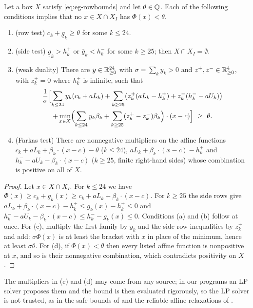 \begin{lemma}\label{lem:eg-boxtests}
Let a box $X$ satisfy \eqref{eq:eg-rowbounds} and let $\theta\in\mathbb{Q}$.
Each of the following conditions implies that no $x\in X\cap X_I$ has $\Phi(x)<\theta$.
\begin{enumerate}
\item[(a)] (row test) $c_k+\underline g_k\ge\theta$ for some $k\le24$.
\item[(b)] (side test) $\underline g_k>h^+_k$ or $\overline g_k<h^-_k$ for some $k\ge25$; then $X\cap X_I=\emptyset$.
\item[(c)] (weak duality) There are $y\in\mathbb{R}^{24}_{\ge0}$ with $\sigma=\sum_ky_k>0$ and $z^+,z^-\in\mathbb{R}^{4}_{\ge0}$, with $z^\pm_k=0$ where $h^\pm_k$ is infinite, such that
\begin{multline*}
  \frac1\sigma\Bigl[\sum_{k\le24}y_k(c_k+aL_k)+\sum_{k\ge25}\bigl(z^+_k(aL_k-h^+_k)+z^-_k(h^-_k-aU_k)\bigr)\\
  +\min_{x\in X}\Bigl(\sum_{k\le24}y_k\beta_k+\sum_{k\ge25}(z^+_k-z^-_k)\beta_k\Bigr)\cdot(x-c)\Bigr]\ \ge\ \theta .
\end{multline*}
\item[(d)] (Farkas test) There are nonnegative multipliers on the affine functions $c_k+aL_k+\beta_k\cdot(x-c)-\theta$ ($k\le24$), $aL_k+\beta_k\cdot(x-c)-h^+_k$ and $h^-_k-aU_k-\beta_k\cdot(x-c)$ ($k\ge25$, finite right-hand sides) whose combination is positive on all of $X$.
\end{enumerate}
\end{lemma}

\begin{proof}
Let $x\in X\cap X_I$.
For $k\le24$ we have $\Phi(x)\ge c_k+g_k(x)\ge c_k+aL_k+\beta_k\cdot(x-c)$.
For $k\ge25$ the side rows give $aL_k+\beta_k\cdot(x-c)-h^+_k\le g_k(x)-h^+_k\le0$ and $h^-_k-aU_k-\beta_k\cdot(x-c)\le h^-_k-g_k(x)\le0$.
Conditions (a) and (b) follow at once.
For (c), multiply the first family by $y_k$ and the side-row inequalities by $z^\pm_k$ and add: $\sigma\Phi(x)$ is at least the bracket with $x$ in place of the minimum, hence at least $\sigma\theta$.
For (d), if $\Phi(x)<\theta$ then every listed affine function is nonpositive at $x$, and so is their nonnegative combination, which contradicts positivity on $X$.
\end{proof}

The multipliers in (c) and (d) may come from any source; in our programs an LP solver proposes them and the bound is then evaluated rigorously, so the LP solver is not trusted, as in the safe bounds of \citet{neumaier2004-safe-bounds-in-linear-and} and the reliable affine relaxations of \citet{ninin2015-a-reliable-affine-relaxation-method}.

